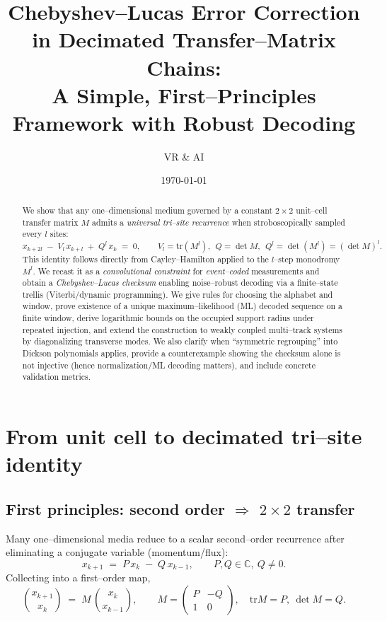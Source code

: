 \documentclass[11pt]{article}
\title{\textbf{Chebyshev--Lucas Error Correction in Decimated Transfer--Matrix Chains:\\
A Simple, First--Principles Framework with Robust Decoding}}
\author{VR \& AI}
\date{\today}
\theoremstyle{definition}
\theoremstyle{remark}
\newcommand{\C}{\mathbb{C}}
\newcommand{\tr}{\mathrm{tr}}
\begin{document}
\maketitle

\begin{abstract}
We show that any one--dimensional medium governed by a constant $2\times2$ unit--cell transfer matrix $M$ admits a \emph{universal tri--site recurrence} when stroboscopically sampled every $l$ sites:
\[
x_{k+2l}\;-\;V_l\,x_{k+l}\;+\;Q^l\,x_k \;=\; 0,\qquad V_l=\tr(M^l),\ \ Q=\det M,\ \ Q^l=\det(M^l)=(\det M)^l.
\]
This identity follows directly from Cayley--Hamilton applied to the $l$--step monodromy $M^l$.
We recast it as a \emph{convolutional constraint} for \emph{event--coded} measurements and obtain a
\emph{Chebyshev--Lucas checksum} enabling noise--robust decoding via a finite--state trellis (Viterbi/dynamic programming).
We give rules for choosing the alphabet and window, prove existence of a unique maximum--likelihood (ML) decoded sequence on a finite window, derive logarithmic bounds on the occupied support radius under repeated injection, and extend the construction to weakly coupled multi--track systems by diagonalizing transverse modes.
We also clarify when ``symmetric regrouping'' into Dickson polynomials applies, provide a counterexample showing the checksum alone is not injective (hence normalization/ML decoding matters), and include concrete validation metrics.
\end{abstract}

\tableofcontents

\section{From unit cell to decimated tri--site identity}
\subsection{First principles: second order $\Rightarrow$ $2\times2$ transfer}
Many one--dimensional media reduce to a scalar second--order recurrence after eliminating a conjugate variable (momentum/flux):
\begin{equation}\label{eq:secondorder}
x_{k+1} \;=\; P\,x_k \;-\; Q\,x_{k-1},\qquad P,Q\in\C,\ Q\neq 0.
\end{equation}
Collecting into a first--order map,
\begin{equation}\label{eq:transfer}
\binom{x_{k+1}}{x_k}\;=\; M\,\binom{x_k}{x_{k-1}},\qquad
M=\begin{pmatrix} P & -Q\\[2pt] 1 & 0\end{pmatrix},\quad \tr M=P,\ \det M=Q.
\end{equation}
\end{document}
